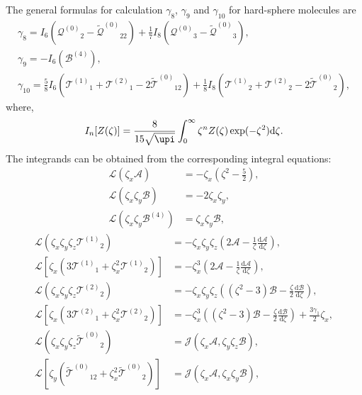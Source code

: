 \documentclass[final]{jfm} %
\newcommand{\dd}{\mathrm{d}}
\newcommand{\der}[2][]{\frac{\dd#1}{\dd#2}}
\newcommand{\B}{\ensuremath{\mathcal{B}^{(4)}}}
\newcommand{\Q}{\ensuremath{\mathcal{Q}^{(0)}}}
\newcommand{\T}[1]{\ensuremath{\mathcal{T}^{(#1)}}}
\newcommand{\TT}{\ensuremath{\tilde{\mathcal{T}}^{(0)}}}
\newcommand{\QQ}{\ensuremath{\tilde{\mathcal{Q}}^{(0)}}}
\begin{document}
The general formulas for calculation \(\gamma_8\), \(\gamma_9\) and \(\gamma_{10}\)
for hard-sphere molecules are~\citep{Sone2000, Sone2002, Sone2007}
\begin{gather}
    \gamma_8 = I_6\left(\Q_2 - \QQ_{22}\right) + \frac17 I_8\left(\Q_3 - \QQ_3\right), \label{eq:gamma_8}\\
    \gamma_9 = -I_6\left(\B\right), \label{eq:gamma_9}\\
    \gamma_{10} = \frac58 I_6\left(\T{1}_1 + \T{2}_1 - 2\TT_{12}\right)
        + \frac18 I_8\left(\T{1}_2 + \T{2}_2 - 2\TT_2\right), \label{eq:gamma_10}
\end{gather}
where,
\begin{equation}\label{eq:I_n}
    I_n[Z(\zeta)] = \frac{8}{15\sqrt{\upi}} \int_0^\infty \zeta^n Z(\zeta) \exp(-\zeta^2) \dd\zeta.
\end{equation}
The integrands can be obtained from the corresponding integral equations:
\begin{align}
    \mathcal{L}\left(\zeta_x\mathcal{A}\right) &= -\zeta_x\left(\zeta^2-\frac52\right), \label{eq:A}\\
    \mathcal{L}\left(\zeta_x\zeta_y\mathcal{B}\right) &= -2\zeta_x\zeta_y, \label{eq:B}\\
    \mathcal{L}\left(\zeta_x\zeta_y\B\right) &= \zeta_x\zeta_y\mathcal{B}, \label{eq:B_4}
\end{align}
\begin{align}
    \mathcal{L}\left( \zeta_x\zeta_y\zeta_z\T{1}_2 \right)
        &= -\zeta_x\zeta_y\zeta_z\left(2\mathcal{A} - \frac1\zeta\der[\mathcal{A}]{\zeta}\right), \label{eq:T2a}\\
    \mathcal{L}\left[ \zeta_x\left(3\T{1}_1 + \zeta_x^2\T{1}_2\right) \right]
        &= -\zeta_x^3\left(2\mathcal{A} - \frac1\zeta\der[\mathcal{A}]{\zeta}\right), \label{eq:T1a}\\
    \mathcal{L}\left( \zeta_x\zeta_y\zeta_z\T{2}_2 \right)
        &= -\zeta_x\zeta_y\zeta_z\left((\zeta^2-3)\mathcal{B} - \frac\zeta2\der[\mathcal{B}]{\zeta}\right), \label{eq:T2b}\\
    \mathcal{L}\left[ \zeta_x\left(3\T{2}_1 + \zeta_x^2\T{2}_2\right) \right]
        &= -\zeta_x^3\left((\zeta^2-3)\mathcal{B} - \frac\zeta2\der[\mathcal{B}]{\zeta}\right) + \frac{3\gamma_1}{2}\zeta_x, \label{eq:T1b}\\
    \mathcal{L}\left( \zeta_x\zeta_y\zeta_z\TT_2 \right)
        &= \mathcal{J}\left( \zeta_x\mathcal{A}, \zeta_y\zeta_z\mathcal{B} \right), \label{eq:TT2}\\
    \mathcal{L}\left[ \zeta_y\left(\TT_{12} + \zeta_x^2\TT_2\right) \right]
        &= \mathcal{J}\left( \zeta_x\mathcal{A}, \zeta_x\zeta_y\mathcal{B} \right), \label{eq:TT12}
\end{align}
\end{document}

